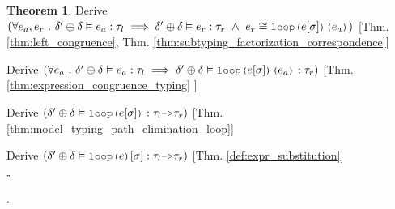\documentclass[acmsmall]{acmart}
\theoremstyle{definition}
\newtheorem{theorem}{Theorem}[section]
\newtheorem{definition}{Definition}[section]
\begin{document}
\begin{theorem}
  \item \I\I \N Derive $(
    \forall e_a, e_r \qua 
    \delta' \oplus \delta \satisfies e_a \hastype \tau_l 
    \implies 
    \delta' \oplus \delta \satisfies e_r \hastype \tau_r 
    \up
    e_r \cong \J{loop(}e[\sigma]\J{)(} e_a \J{)}
  )$ [Thm. \ref{thm:left_congruence}, Thm. \ref{thm:subtyping_factorization_correspondence}]

  \item \I\I \N Derive $(
    \forall e_a \qua 
    \delta' \oplus \delta \satisfies e_a \hastype \tau_l 
    \implies 
    \delta' \oplus \delta \satisfies \J{loop(}e[\sigma]\J{)(} e_a \J{)} \hastype \tau_r 
  )$ [Thm. \ref{thm:expression_congruence_typing} ]

  \item \I\I \N Derive $(
    \delta' \oplus \delta  \satisfies \J{loop(}e[\sigma]\J{)} \hastype \tau_l \J{->}\tau_r 
  )$ [Thm. \ref{thm:model_typing_path_elimination_loop}]

  \item \I\I \N Derive $(
    \delta' \oplus \delta  \satisfies \J{loop(}e\J{)}[\sigma] \hastype \tau_l \J{->}\tau_r 
  )$ [Thm. \ref{def:expr_substitution}]

  \noindent
  $\square$

\end{theorem}


.





\end{document}
